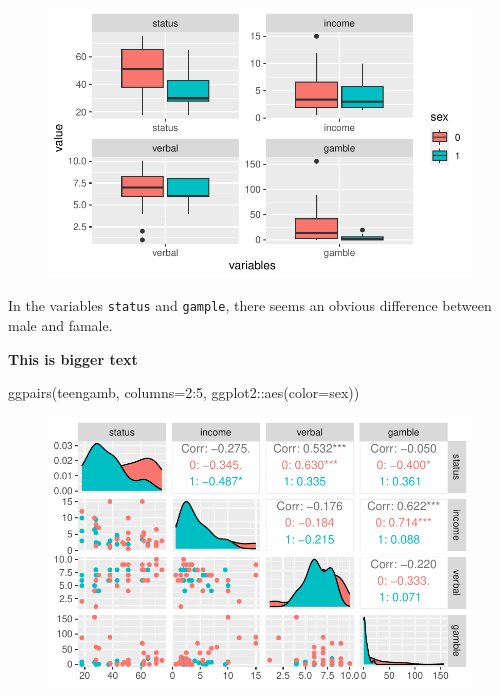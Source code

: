 \documentclass[
  12pt,
  a4paperpaper,
]{article}
\newenvironment{Shaded}{\begin{snugshade}}{\end{snugshade}}
\newcommand{\AttributeTok}[1]{\textcolor[rgb]{0.40,0.45,0.13}{#1}}
\newcommand{\DecValTok}[1]{\textcolor[rgb]{0.68,0.00,0.00}{#1}}
\newcommand{\FunctionTok}[1]{\textcolor[rgb]{0.28,0.35,0.67}{#1}}
\newcommand{\NormalTok}[1]{\textcolor[rgb]{0.00,0.23,0.31}{#1}}
\newcommand{\SpecialCharTok}[1]{\textcolor[rgb]{0.37,0.37,0.37}{#1}}
\begin{document}
\begin{figure}[H]

{\centering \includegraphics{HW1_files/figure-pdf/p111-1.pdf}

}

\end{figure}

In the variables \texttt{status} and \texttt{gample}, there seems an
obvious difference between male and famale.

\textbf{This is bigger text}

\begin{Shaded}
\begin{Highlighting}[numbers=left,,]
\FunctionTok{ggpairs}\NormalTok{(teengamb, }\AttributeTok{columns=}\DecValTok{2}\SpecialCharTok{:}\DecValTok{5}\NormalTok{, ggplot2}\SpecialCharTok{::}\FunctionTok{aes}\NormalTok{(}\AttributeTok{color=}\NormalTok{sex))}
\end{Highlighting}
\end{Shaded}

\begin{figure}[H]

{\centering \includegraphics{HW1_files/figure-pdf/p1111-1.pdf}

}

\end{figure}
\end{document}
